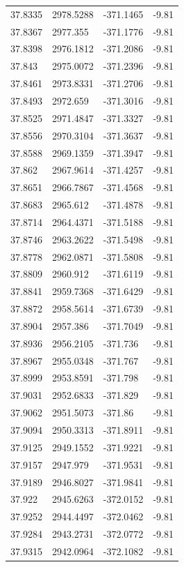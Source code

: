 \begin{table}[H]
\begin{tabular}{llll}
37.8335 & 2978.5288 & -371.1465 & -9.81 \\
37.8367 & 2977.355 & -371.1776 & -9.81 \\
37.8398 & 2976.1812 & -371.2086 & -9.81 \\
37.843 & 2975.0072 & -371.2396 & -9.81 \\
37.8461 & 2973.8331 & -371.2706 & -9.81 \\
37.8493 & 2972.659 & -371.3016 & -9.81 \\
37.8525 & 2971.4847 & -371.3327 & -9.81 \\
37.8556 & 2970.3104 & -371.3637 & -9.81 \\
37.8588 & 2969.1359 & -371.3947 & -9.81 \\
37.862 & 2967.9614 & -371.4257 & -9.81 \\
37.8651 & 2966.7867 & -371.4568 & -9.81 \\
37.8683 & 2965.612 & -371.4878 & -9.81 \\
37.8714 & 2964.4371 & -371.5188 & -9.81 \\
37.8746 & 2963.2622 & -371.5498 & -9.81 \\
37.8778 & 2962.0871 & -371.5808 & -9.81 \\
37.8809 & 2960.912 & -371.6119 & -9.81 \\
37.8841 & 2959.7368 & -371.6429 & -9.81 \\
37.8872 & 2958.5614 & -371.6739 & -9.81 \\
37.8904 & 2957.386 & -371.7049 & -9.81 \\
37.8936 & 2956.2105 & -371.736 & -9.81 \\
37.8967 & 2955.0348 & -371.767 & -9.81 \\
37.8999 & 2953.8591 & -371.798 & -9.81 \\
37.9031 & 2952.6833 & -371.829 & -9.81 \\
37.9062 & 2951.5073 & -371.86 & -9.81 \\
37.9094 & 2950.3313 & -371.8911 & -9.81 \\
37.9125 & 2949.1552 & -371.9221 & -9.81 \\
37.9157 & 2947.979 & -371.9531 & -9.81 \\
37.9189 & 2946.8027 & -371.9841 & -9.81 \\
37.922 & 2945.6263 & -372.0152 & -9.81 \\
37.9252 & 2944.4497 & -372.0462 & -9.81 \\
37.9284 & 2943.2731 & -372.0772 & -9.81 \\
37.9315 & 2942.0964 & -372.1082 & -9.81 \\

\end{tabular}
\end{table}

